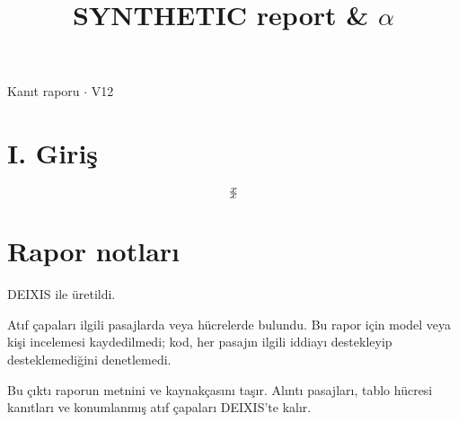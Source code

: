 \documentclass[journal]{IEEEtran}
\begin{document}
\renewcommand{\abstractname}{Özet}
\renewcommand{\IEEEkeywordsname}{Dizin Terimleri}
\renewcommand{\refname}{Kaynaklar}

\title{SYNTHETIC report \& \ensuremath{\alpha}}

\maketitle

\noindent Kanıt raporu \ensuremath{\cdot} V12

\section*{I. Giriş}

\begin{equation}
\label{eq:EQ1}
x
\end{equation}
\cite{Synth26}
\begin{equation*}
x
\end{equation*}
\cite{Synth26}

\section*{Rapor notları}

DEIXIS ile üretildi.

Atıf çapaları ilgili pasajlarda veya hücrelerde bulundu. Bu rapor için model veya kişi incelemesi kaydedilmedi; kod, her pasajın ilgili iddiayı destekleyip desteklemediğini denetlemedi.

Bu çıktı raporun metnini ve kaynakçasını taşır. Alıntı pasajları, tablo hücresi kanıtları ve konumlanmış atıf çapaları DEIXIS'te kalır.




\end{document}
